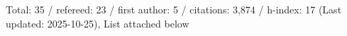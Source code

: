 Total: 35 / refereed: 23 / first author: 5 / citations: 3,874 / h-index: 17 (Last updated: 2025-10-25), List attached below